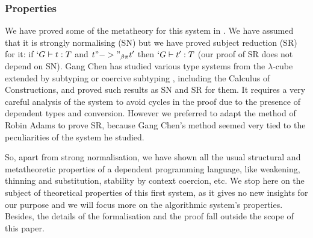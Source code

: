 \documentclass{llncs}
\begin{document}
\subsubsection{Properties}
We have proved some of the metatheory for this system in \Coq{}
\cite{sozeau:Coq/Russell/meta-web}.
We have assumed that it is strongly
normalising (SN) but we have proved subject reduction (SR) for it: 
if $`G \vdash t : T$ and $t "->"_{\beta\pi} t'$ then $`G \vdash t' :
T$ (our proof of SR does not depend on SN).
Gang Chen \cite{ChenPhD} has studied various type systems from the
$\lambda$-cube extended by subtyping or coercive subtyping
\cite{DBLP:conf/csl/Luo96}, including the Calculus of Constructions, and
proved such results as SN and SR for them. It requires a very careful
analysis of the system to avoid cycles in the proof due to the presence
of dependent types and conversion. However we preferred to adapt the method of
Robin Adams \cite{adams:PTSEQ} to prove SR, because Gang Chen's method
seemed very tied to the peculiarities of the system he studied. 

So, apart from strong normalisation, we have shown all the usual structural
and metatheoretic properties of a dependent programming language, like
weakening, thinning and substitution, stability by context coercion, etc.
We stop here on the subject of theoretical properties of this first system, as
it gives no new insights for our purpose and we will focus more on the
algorithmic system's properties. Besides, the details of the
formalisation and the proof fall outside the scope of this paper.


\end{document}
